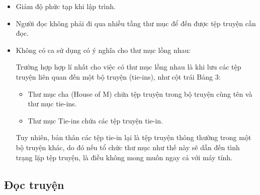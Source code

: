 \documentclass[../../thesis]{subfiles}
\begin{document}
\begin{itemize}
    \item
        Giảm độ phức tạp khi lập trình.
    \item
        Người đọc không phải đi qua nhiều tầng thư mục để đến được tệp truyện
        cần đọc.
    \item
        Không có ca sử dụng có ý nghĩa cho thư mục lồng nhau:

        Trường hợp hợp lí nhất cho việc có thư mục lồng nhau là khi lưu các tệp
        truyện liên quan đến một bộ truyện (tie-ins), như cột trái Bảng 3:

        \begin{itemize}
            \item
                Thư mục cha (House of M) chứa tệp truyện trong bộ truyện cùng
                tên và thư mục tie-ins.
            \item
                Thư mục Tie-ins chứa các tệp truyện tie-in.
        \end{itemize}

        Tuy nhiên, bản thân các tệp tie-in lại là tệp truyện thông thường trong
        một bộ truyện khác, do đó nếu tổ chức thư mục như thế này sẽ dẫn đến
        tình trạng lặp tệp truyện, là điều không mong muốn ngay cả với máy tính.
\end{itemize}

\subsection{Đọc truyện}\label{sec:read-comic}
\end{document}
